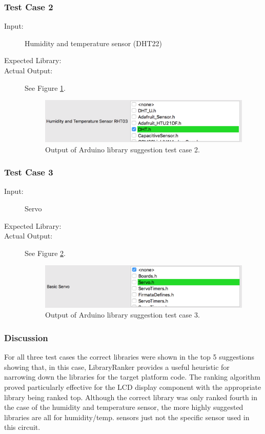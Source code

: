 \documentclass{UoYCSproject}
\begin{document}
\subsubsection{Test Case 2}
\begin{description}
\item[Input:] Humidity and temperature sensor (DHT22)
\item[Expected Library:] 
\item[Actual Output:] See Figure \ref{fig:lib_suggest_humidity}.
\begin{figure}[h!]
  \centering
  \includegraphics[width=0.5\linewidth]{graphics/lib_suggest_humidity.png}
  \caption{Output of Arduino library suggestion test case 2.}
  \label{fig:lib_suggest_humidity}
\end{figure}
\end{description}

\subsubsection{Test Case 3}
\begin{description}
\item[Input:] Servo
\item[Expected Library:] 
\item[Actual Output:] See Figure \ref{fig:lib_suggest_servo}.
\begin{figure}[h!]
  \centering
  \includegraphics[width=0.5\linewidth]{graphics/lib_suggest_servo.png}
  \caption{Output of Arduino library suggestion test case 3.}
  \label{fig:lib_suggest_servo}
\end{figure}
\end{description}

\subsubsection{Discussion} \label{arduino_lib_discussion}
For all three test cases the correct libraries were shown in the top 5 suggestions showing that, in this case, LibraryRanker provides a useful heuristic for narrowing down the libraries for the target platform code. The ranking algorithm proved particularly effective for the LCD display component with the appropriate  library being ranked top. Although the correct library was only ranked fourth in the case of the humidity and temperature sensor, the more highly suggested libraries are all for humidity/temp. sensors just not the specific  sensor used in this circuit.
\end{document}
